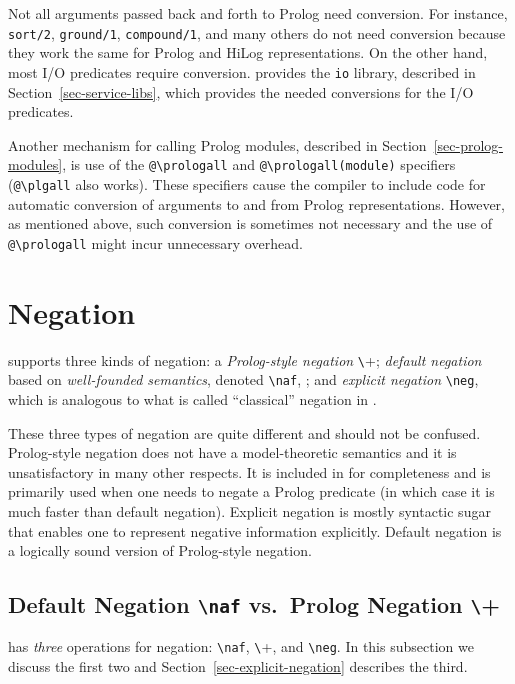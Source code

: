 \documentclass[11pt]{article}
\newcommand{\ERGO}{\mbox{\smaller{\ensuremath{\cal{E}}\smaller{{\sc{RGO}}}}}\xspace}
\newcommand{\FLSYSTEM}{\ERGO}
\newcommand{\bs}{\textbackslash}
\newcommand{\PLGNAF}{\mbox{\texttt{\bs}+}\xspace}
\newcommand{\RULELOGNAF}{{\texttt{{\bs}naf}}\xspace}
\newcommand{\RULELOGNEG}{{\texttt{{\bs}neg}}\xspace}
\begin{document}
Not all arguments passed back and forth to Prolog need conversion. For
instance, {\tt sort/2}, {\tt ground/1}, {\tt compound/1}, and many others
do not need conversion because they work the same for Prolog and HiLog
representations. On the other hand, most I/O predicates require conversion.
\FLSYSTEM provides the {\tt io} library, described in
Section~\ref{sec-service-libs}, which provides the needed conversions for
the I/O predicates.


\index{"@\bs{}prologall}
\index{"@\bs{}plgall}
Another mechanism for calling Prolog modules, described in
Section~\ref{sec-prolog-modules}, is use of the {\tt @\bs{}prologall} and
{\tt @\bs{}prologall(module)} specifiers ({\tt @\bs{}plgall} also works). These
specifiers cause the compiler to include code for automatic conversion of
arguments to and from Prolog representations. However, as mentioned above,
such conversion is sometimes not necessary and the use of {\tt
  @\bs{}prologall} might incur unnecessary overhead.



\section{Negation} \label{sec:negation}


\FLSYSTEM supports three kinds of negation: a \emph{Prolog-style negation}
  \PLGNAF \cite{Cla78}; \emph{default negation} based on
\emph{well-founded semantics}, denoted \texttt{\RULELOGNAF}, 
\cite{gelder-alternating-89,gelder-ross-schlipf-91}; and \emph{explicit
  negation} \texttt{\RULELOGNEG}, which is analogous to what is called ``classical'' negation in
\cite{gelfond91classical}.
 
These three types of negation are quite different and should not be
confused. Prolog-style negation does not have a model-theoretic semantics
and it is unsatisfactory in many other respects. It is included in \FLSYSTEM
for completeness and is primarily used when one needs to negate a Prolog
predicate (in which case it is much faster than default negation).
Explicit negation is mostly syntactic sugar that enables one to represent
negative information explicitly. Default negation is a logically sound
version of Prolog-style negation.

\subsection{Default Negation \RULELOGNAF  vs.~Prolog Negation \PLGNAF}\label{sec-negation}
\index{\RULELOGNAF}
\index{\PLGNAF}
\FLSYSTEM has \emph{three} operations for negation: \RULELOGNAF, \PLGNAF, and {\tt \RULELOGNEG}.
In this subsection we discuss the first two and
Section~\ref{sec-explicit-negation} describes the third.
\end{document}
